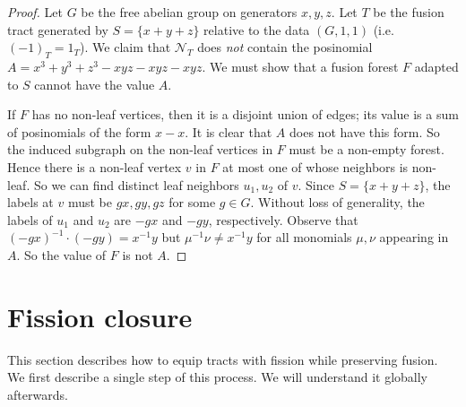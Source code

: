 \documentclass[reqno]{amsart}
\theoremstyle{definition}
\theoremstyle{remark}
\begin{document}
    \begin{proof}
    Let $G$ be the free abelian group on generators $x,y,z$.
    Let $T$ be the fusion tract generated by $S = \{x+y+z\}$ relative to the data $(G, 1, 1)$ (i.e.\ $(-1)_T = 1_T$).
    We claim that $\mathcal{N}_T$ does \emph{not} contain the posinomial $A = x^3+y^3+z^3 - xyz-xyz-xyz$. 
    We must show that a fusion forest $F$ adapted to $S$ cannot have the value $A$. 
    
    If $F$ has no non-leaf vertices, then it is a disjoint union of edges; its value is a sum of posinomials of the form $x-x$. It is clear that $A$ does not have this form.
    So the induced subgraph on the non-leaf vertices in $F$ must be a non-empty forest. Hence there is a non-leaf vertex $v$ in $F$ at most one of whose neighbors is non-leaf. So we can find distinct leaf neighbors $u_1, u_2$ of $v$.
    Since $S = \{x+y+z\}$, the labels at $v$ must be $gx, gy, gz$ for some $g \in G$.
    Without loss of generality, the labels of $u_1$ and $u_2$ are $-gx$ and $-gy$, respectively. 
    Observe that
    $(-gx)^{-1}\cdot (-gy) = x^{-1}y$ but
    $\mu^{-1} \nu \neq x^{-1} y$ for all monomials 
    $\mu, \nu$ appearing in $A$. So the value of $F$ is not $A$.
    \end{proof}

\section{Fission closure}\label{sec:fission_closure}
This section describes how to equip tracts with fission while preserving fusion.
We first describe a single step of this process. We will understand it globally afterwards.
\end{document}

